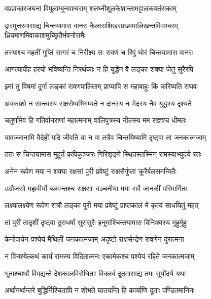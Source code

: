 \twolineshloka
{वप्रप्राकारजघनां विपुलाम्बुनवाम्बराम्}
{शतघ्नीशूलकेशान्तामट्टालकवतंसकाम्} %

\threelineshloka
{द्वारमुत्तरमासाद्य चिन्तयामास वानरः}
{कैलासशिखरप्रख्यमालिखन्तमिवाम्बरम्}
{ध्रियमाणमिवाकाशमुच्छ्रितैर्भवनोत्तमैः} %

\twolineshloka
{तस्याश्च महतीं गुप्तिं सागरं च निरीक्ष्य सः}
{रावणं च रिपुं घोरं चिन्तयामास वानरः} %

\twolineshloka
{आगत्यापीह हरयो भविष्यन्ति निरर्थकाः}
{न हि युद्धेन वै लङ्का शक्या जेतुं सुरैरपि} %

\twolineshloka
{इमां तु विषमां दुर्गां लङ्कां रावणपालिताम्}
{प्राप्यापि स महाबाहुः किं करिष्यति राघवः} %

\twolineshloka
{अवकाशो न सान्त्वस्य राक्षसेष्वभिगम्यते}
{न दानस्य न भेदस्य नैव युद्धस्य दृश्यते} %

\twolineshloka
{चतुर्णामेव हि गतिर्वानराणां महात्मनाम्}
{वालिपुत्रस्य नीलस्य मम राज्ञश्च धीमतः} %

\twolineshloka
{यावज्जानामि वैदेहीं यदि जीवति वा न वा}
{तत्रैव चिन्तयिष्यामि दृष्ट्वा तां जनकात्मजाम्} %

\twolineshloka
{ततः स चिन्तयामास मुहूर्तं कपिकुञ्जरः}
{गिरिशृङ्गे स्थितस्तस्मिन् रामस्याभ्युदये रतः} %

\twolineshloka
{अनेन रूपेण मया न शक्या रक्षसां पुरी}
{प्रवेष्टुं राक्षसैर्गुप्ता क्रूरैर्बलसमन्वितैः} %

\twolineshloka
{उग्रौजसो महावीर्यो बलवन्तश्च राक्षसाः}
{वञ्चनीया मया सर्वे जानकीं परिमार्गिता} %

\twolineshloka
{लक्ष्यालक्ष्येण रूपेण रात्रौ लङ्का पुरी मया}
{प्रवेष्टुं प्राप्तकालं मे कृत्यं साधयितुं महत्} %

\twolineshloka
{तां पुरीं तादृशीं दृष्ट्वा दुराधर्षां सुरासुरैः}
{हनूमांश्चिन्तयामास विनिःश्वस्य मुहुर्मुहुः} %

\twolineshloka
{केनोपायेन पश्येयं मैथिलीं जनकात्मजाम्}
{अदृष्टो राक्षसेन्द्रेण रावणेन दुरात्मना} %

\twolineshloka
{न विनश्येत्कथं कार्यं रामस्य विदितात्मनः}
{एकामेकश्च पश्येयं रहिते जनकात्मजाम्} %

\twolineshloka
{भूताश्चार्थो विपद्यन्ते देशकालविरोधिताः}
{विक्लवं दूतमासाद्य तमः सूर्योदये यथा} %

\twolineshloka
{अर्थानर्थान्तरे बुद्धिर्निश्चितापि न शोभते}
{घातयन्ति हि कार्याणि दूताः पण्डितमानिनः} %

